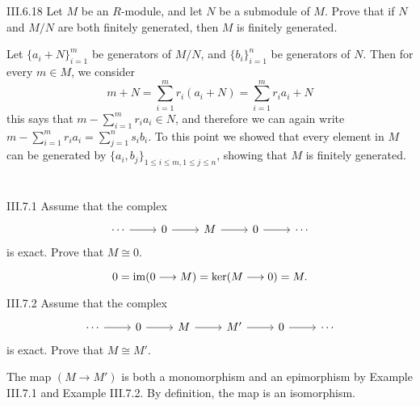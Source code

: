 \begin{problem}{III.6.18}
Let $M$ be an $R$-module, and let $N$ be a submodule of $M$. Prove that if $N$ and $M/N$ are both finitely generated, then $M$ is finitely generated.
\end{problem}
\begin{pf}
Let $\{a_i + N\}_{i = 1}^m$ be generators of $M/N$, and $\{b_i\}_{i = 1}^n$ be generators of $N$. Then for every $m \in M$, we consider
\[
m + N = \sum_{i=1}^m r_i (a_i + N) = \sum_{i=1}^m r_i a_i + N
\]
this says that $m - \sum_{i=1}^m r_i a_i \in N$, and therefore we can again write $m - \sum_{i=1}^m r_i a_i = \sum_{j=1}^n s_i b_i$. To this point we showed that every element in $M$ can be generated by $\{a_i,b_j\}_{1 \leq i \leq m, 1 \leq j \leq n}$, showing that $M$ is finitely generated.
\end{pf}

\section{}

\begin{problem}{III.7.1}
Assume that the complex
\[
\begin{tikzcd}
\cdots \arrow[r] &0 \arrow[r] &M \arrow[r] &0 \arrow[r] &\cdots 
\end{tikzcd}
\]
is exact. Prove that $M \cong 0$.
\end{problem}
\begin{pf}
\[
0 = \operatorname{im} (0 \longrightarrow M) = \ker (M \longrightarrow 0) = M.
\]
\end{pf}

\begin{problem}{III.7.2}
Assume that the complex
\[
\begin{tikzcd}
\cdots \arrow[r] &0 \arrow[r] &M \arrow[r] &M' \arrow[r] &0 \arrow[r] &\cdots 
\end{tikzcd}
\]
is exact. Prove that $M \cong M'$.
\end{problem}
\begin{pf}
The map $(M \longrightarrow M')$ is both a monomorphism and an epimorphism by Example III.7.1 and Example III.7.2. By definition, the map is an isomorphism. 
\end{pf}

